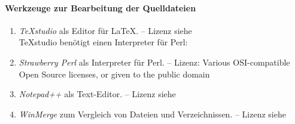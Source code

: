 \paragraph{Werkzeuge zur Bearbeitung der Quelldateien}%

\begin{enumerate}
	\setcounter{enumi}{\value{Enumi}}%

	\item\label{Werkzeug:TeXstudio}\emph{\TeX studio} als Editor für \LaTeX.
	-- Lizenz siehe~\cite{bib:GPLii}\\
	\TeX studio benötigt einen Interpreter für Perl:

	\item\label{Werkzeug:Perl}\emph{Strawberry Perl}
	als Interpreter für Perl.
	-- Lizenz:
	Various OSI-compatible Open Source licenses,
	or given to the public domain

	\item\label{Werkzeug:Notepadpp}\emph{Notepad++} als Text-Editor.
	-- Lizenz siehe~\cite{bib:GPLi}

	\item\label{Werkzeug:WinMerge}\emph{WinMerge}
	zum Vergleich von Dateien und Verzeichnissen.
	-- Lizenz siehe~\cite{bib:GPLi}

	\setcounter{Enumi}{\value{enumi}}%
\end{enumerate}

